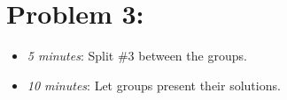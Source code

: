 \documentclass[handout,nooutcomes]{ximera}
\begin{document}
	
	
\section*{Problem 3:}

	\begin{itemize}
	
	\item  \emph{5 minutes}:  Split \#3 between the groups.
	
	\item  \emph{10 minutes}:  Let groups present their solutions.
	
	\end{itemize}
	



	
	
	

	
	

	
	
	

	
	
	
\end{document}
